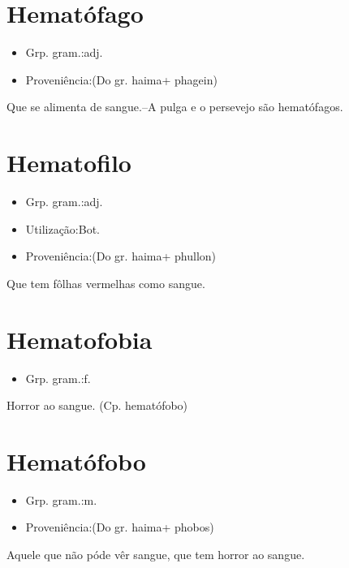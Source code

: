 \documentclass{article}
\begin{document}
\section{Hematófago}
\begin{itemize}
\item {Grp. gram.:adj.}
\end{itemize}
\begin{itemize}
\item {Proveniência:(Do gr. \textunderscore haima\textunderscore  + \textunderscore phagein\textunderscore )}
\end{itemize}
Que se alimenta de sangue.--A pulga e o persevejo são hematófagos.
\section{Hematofilo}
\begin{itemize}
\item {Grp. gram.:adj.}
\end{itemize}
\begin{itemize}
\item {Utilização:Bot.}
\end{itemize}
\begin{itemize}
\item {Proveniência:(Do gr. \textunderscore haima\textunderscore  + \textunderscore phullon\textunderscore )}
\end{itemize}
Que tem fôlhas vermelhas como sangue.
\section{Hematofobia}
\begin{itemize}
\item {Grp. gram.:f.}
\end{itemize}
Horror ao sangue.
(Cp. \textunderscore hematófobo\textunderscore )
\section{Hematófobo}
\begin{itemize}
\item {Grp. gram.:m.}
\end{itemize}
\begin{itemize}
\item {Proveniência:(Do gr. \textunderscore haima\textunderscore  + \textunderscore phobos\textunderscore )}
\end{itemize}
Aquele que não póde vêr sangue, que tem horror ao sangue.
\end{document}
